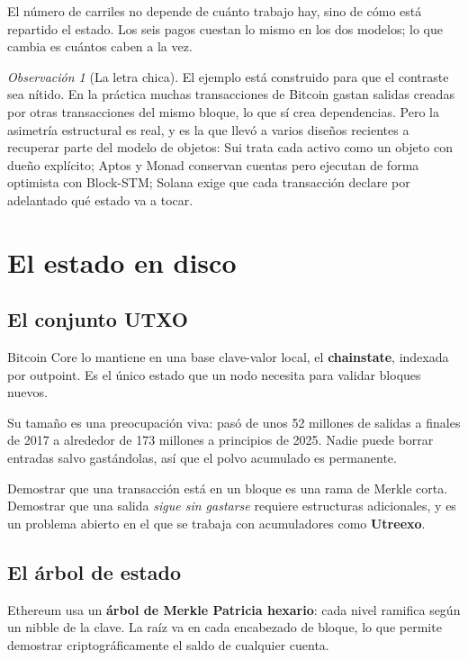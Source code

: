 \documentclass[11pt,a4paper]{article}
\theoremstyle{definition}
\theoremstyle{plain}
\theoremstyle{remark}
\newtheorem*{observacion}{Observación}
\begin{document}
El número de carriles no depende de cuánto trabajo hay, sino de cómo está
repartido el estado. Los seis pagos cuestan lo mismo en los dos modelos; lo que
cambia es cuántos caben a la vez.

\begin{observacion}[La letra chica]
El ejemplo está construido para que el contraste sea nítido. En la práctica
muchas transacciones de Bitcoin gastan salidas creadas por otras transacciones
del mismo bloque, lo que sí crea dependencias. Pero la asimetría estructural es
real, y es la que llevó a varios diseños recientes a recuperar parte del modelo
de objetos: Sui trata cada activo como un objeto con dueño explícito; Aptos y
Monad conservan cuentas pero ejecutan de forma optimista con Block-STM; Solana
exige que cada transacción declare por adelantado qué estado va a tocar.
\end{observacion}

\section{El estado en disco}\label{sec:estado}

\subsection{El conjunto UTXO}

Bitcoin Core lo mantiene en una base clave-valor local, el \textbf{chainstate},
indexada por outpoint. Es el único estado que un nodo necesita para validar
bloques nuevos.

Su tamaño es una preocupación viva: pasó de unos 52 millones de salidas a finales
de 2017 a alrededor de 173 millones a principios de 2025. Nadie puede borrar
entradas salvo gastándolas, así que el polvo acumulado es permanente.

Demostrar que una transacción está en un bloque es una rama de Merkle corta.
Demostrar que una salida \emph{sigue sin gastarse} requiere estructuras
adicionales, y es un problema abierto en el que se trabaja con acumuladores como
\textbf{Utreexo}.

\subsection{El árbol de estado}

Ethereum usa un \textbf{árbol de Merkle Patricia hexario}: cada nivel ramifica
según un nibble de la clave. La raíz va en cada encabezado de bloque, lo que
permite demostrar criptográficamente el saldo de cualquier cuenta.
\end{document}

